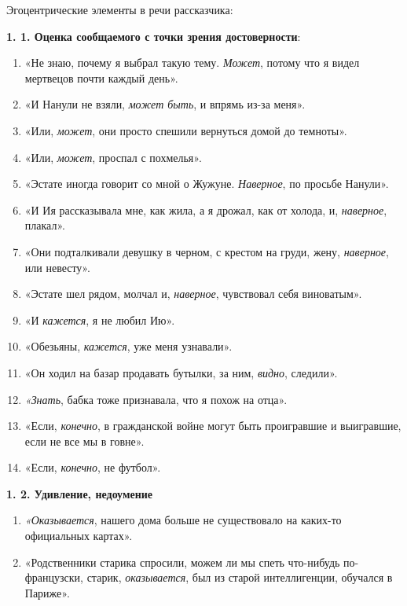 \documentclass{kursa4}
\begin{document}
{      Эгоцентрические элементы в речи
      рассказчика:

      {\par}

      \textbf{1. 1. Оценка сообщаемого с точки
      зрения достоверности}:
      \begin{enumerate}
        \item «Не знаю, почему я выбрал такую тему. \textit{Может}, потому что я
        видел мертвецов почти каждый день».
        \item «И Нанули не взяли, \textit{может быть}, и впрямь из-за меня».
        \item «Или, \textit{может}, они просто спешили вернуться домой до
        темноты».
        \item «Или, \textit{может}, проспал с похмелья».
        \item «Эстате иногда говорит со мной о Жужуне. \textit{Наверное}, по
        просьбе Нанули». 
        \item «И Ия рассказывала мне, как жила, а я дрожал, как от холода, и,
        \textit{наверное}, плакал».
        \item «Они подталкивали девушку в черном, с крестом на груди, жену,
        \textit{наверное}, или невесту». 
        \item «Эстате шел рядом, молчал и, \textit{наверное}, чувствовал себя
        виноватым».
        \item «И \textit{кажется}, я не любил Ию».
        \item «Обезьяны, \textit{кажется}, уже меня узнавали».
        \item «Он ходил на базар продавать бутылки, за ним, \textit{видно},
        следили».
        \item \textit{«Знать}, бабка тоже признавала, что я похож на отца».
        \item «Если, \textit{конечно}, в гражданской войне могут быть
        проигравшие и выигравшие, если не все мы в говне».
        \item «Если, \textit{конечно}, не футбол».
      \end{enumerate}

      \textbf{1. 2. Удивление, недоумение}
        \setcounter{saveenum}{\value{enumi}}
        \begin{enumerate}
        \setcounter{enumi}{\value{saveenum}}
        \item \textit{«Оказывается}, нашего дома больше не существовало на
        каких-то официальных картах».
        \item «Родственники старика спросили, можем ли мы спеть что-нибудь
        по-французски, старик, \textit{оказывается}, был из старой
        интеллигенции, обучался в Париже».
      \end{enumerate}

}
\end{document}
